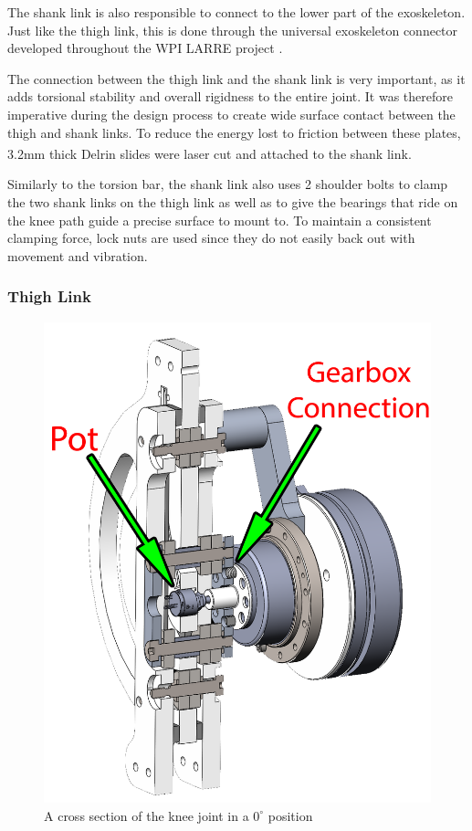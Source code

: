 The shank link is also responsible to connect to the lower part of the exoskeleton. Just like the thigh link, this is done through the universal exoskeleton connector developed throughout the WPI LARRE project \cite{SpringWrapClutchKnee}.

The connection between the thigh link and the shank link is very important, as it adds torsional stability and overall rigidness to the entire joint. It was therefore imperative during the design process to create wide surface contact between the thigh and shank links. To reduce the energy lost to friction between these plates, 3.2mm thick Delrin\textsuperscript{\textregistered} slides were laser cut and attached to the shank link. 

Similarly to the torsion bar, the shank link also uses 2 shoulder bolts to clamp the two shank links on the thigh link as well as to give the bearings that ride on the knee path guide a precise surface to mount to. To maintain a consistent clamping force, lock nuts are used since they do not easily back out with movement and vibration. 

\subsubsection{Thigh Link}

\begin{figure}[ht!]
    \centering
    \includegraphics[width=0.7\linewidth]{Figures/Design/KneeJointAssyCrossSection_edit.png}
    \caption{A cross section of the knee joint in a \(0^\circ\) position}
    \label{fig:KneeJointCrossSection}
\end{figure}

